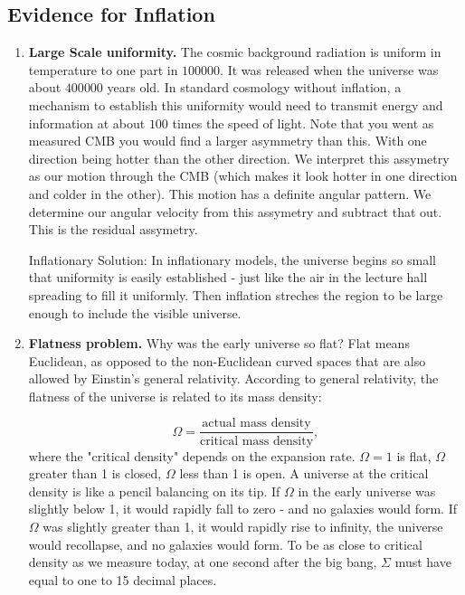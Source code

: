 \subsection*{Evidence for Inflation}
\begin{enumerate}
    \item \textbf{Large Scale uniformity.} The cosmic background radiation is uniform in temperature to one part in $100 000$. It was released when the universe was about $400 000$ years old. In standard cosmology without inflation, a mechanism to establish this uniformity would need to transmit energy and information at about $100$ times the speed of light. Note that you went as measured CMB you would find a larger asymmetry than this. With one direction being hotter than the other direction. We interpret this assymetry as our motion through the CMB (which makes it look hotter in one direction and colder in the other). This motion has a definite angular pattern. We determine our angular velocity from this assymetry and subtract that out. This is the residual assymetry.
    
    Inflationary Solution: In inflationary models, the universe begins so small that uniformity is easily established - just like the air in the lecture hall spreading to fill it uniformly. Then inflation streches the region to be large enough to include the visible universe.

    \item \textbf{Flatness problem.} Why was the early universe so flat? Flat means Euclidean, as opposed to the non-Euclidean curved spaces that are also allowed by Einstin's general relativity. According to general relativity, the flatness of the universe is related to its mass density:
    
    \begin{equation*}
        \Omega = \frac{{\text{actual mass density}}}{\text{critical mass density}},
    \end{equation*}
    where the "critical density" depends on the expansion rate. $\Omega = 1$ is flat, $\Omega$ greater than 1 is closed, $\Omega$ less than 1 is open. A universe at the critical density is like a pencil balancing on its tip. If $\Omega$ in the early universe was slightly below 1, it would rapidly fall to zero - and no galaxies would form. If $\Omega$ was slightly greater than 1, it would rapidly rise to infinity, the universe would recollapse, and no galaxies would form. To be as close to critical density as we measure today, at one second after the big bang, $\Sigma$ must have equal to one to 15 decimal places.


\end{enumerate}
